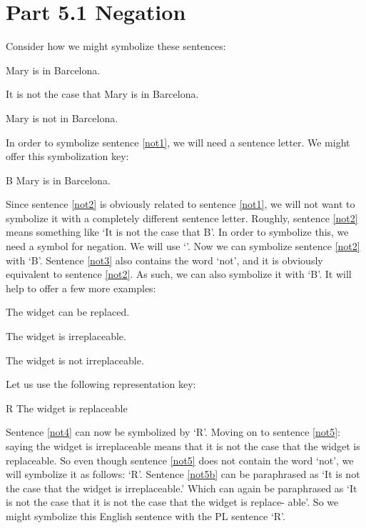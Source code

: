 \section{Part 5.1 Negation }
\label{s:Part 5.1 Negation}
Consider how we might symbolize these sentences:
\begin{earg}
	\item[\ex{not1}] Mary is in Barcelona.
	\item[\ex{not2}] It is not the case that Mary is in Barcelona.
	\item[\ex{not3}] Mary is not in Barcelona.
	\end{earg}
In order to symbolize sentence \ref{not1}, we will need a sentence letter. We might offer this symbolization key:
	\begin{ekey}
		\item[B] Mary is in Barcelona.
	\end{ekey}
Since sentence \ref{not2} is obviously related to sentence \ref{not1}, we will not want to symbolize it with a completely different sentence letter. Roughly, sentence \ref{not2} means something like ‘It is not the case that B’. In order to symbolize this, we need a symbol for \gls{negation}. We will use ‘\enot ’. Now we can symbolize sentence \ref{not2} with ‘\enot B’.
Sentence \ref{not3} also contains the word ‘not’, and it is obviously equivalent to sentence \ref{not2}. As such, we can also symbolize it with ‘\enot B’.
It will help to offer a few more examples:
	\begin{earg}
		\item[\ex{not4}] The widget can be replaced.
		\item[\ex{not5}] The widget is irreplaceable.
		\item[\ex{not5b}] The widget is not irreplaceable.
	\end{earg}
Let us use the following representation key:
	\begin{ekey}
		\item[R] The widget is replaceable
	\end{ekey}
Sentence \ref{not4} can now be symbolized by ‘R’. Moving on to sentence \ref{not5}: saying the widget is irreplaceable means that it is not the case that the widget is replaceable. So even though sentence \ref{not5} does not contain the word ‘not’, we will symbolize it as follows: ‘\enot R’.
Sentence \ref{not5b} can be paraphrased as ‘It is not the case that the widget is irreplaceable.’ Which can again be paraphrased as ‘It is not the case that it is not the case that the widget is replace- able’. So we might symbolize this English sentence with the PL sentence ‘\enot \enot R’.
